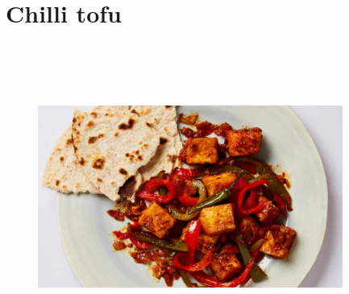 \documentclass{book}
\begin{document}
\section{Chilli tofu}
\begin{figure}
\centering\includegraphics[width=10cm,height=10cm,keepaspectratio]{Recipe_Pictures/Chilli_tofu.png}
\end{figure}
\end{document}
